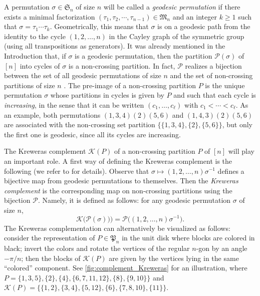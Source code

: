 \documentclass[AHL,XML,longabstracts,Unicode]{cedram}
\def\PPP{\mathcal P}
\begin{document}
A permutation $\sigma \in \mathfrak{S}_{n}$ of size $n$ will be called a {\em geodesic permutation} if
there exists a minimal factorization $(\tau_1,\tau_2,\cdots,\tau_{n-1}) \in \mathfrak{M}_{n}$
and an integer $k \ge 1$ such that $\sigma=\tau_1 \cdots \tau_k$.
Geometrically, this means that $\sigma$ is on a geodesic path from the identity to the cycle
$(1,2,\ldots,n)$ in the Cayley graph of the symmetric group (using all transpositions as generators).
It was already mentioned in the Introduction that, if $\sigma$ is a geodesic permutation,
then the partition $\PPP(\sigma)$ of $[n]$ into cycles of $\sigma$ is a non-crossing partition.
In fact, $\PPP$ realizes a bijection between the set of all  geodesic permutations of size $n$
and the set of non-crossing partitions of size $n$ \cite[Theorem 1]{Biane1997}.
The pre-image of a non-crossing partition $P$ is the unique permutation $\sigma$
whose partitions in cycles is given by $P$ and such that each cycle is {\em increasing},
in the sense that it can be written
$(c_1,\ldots,c_\ell)$ with $c_1<\cdots<c_\ell$.
As an example, both permutations $(1,3,4)(2)(5,6)$ and $(1,4,3)(2)(5,6)$ are associated
with the non-crossing set partition $\{\{1,3,4\},\{2\},\{5,6\}\}$,
but only the first one is geodesic, since all its cycles are increasing.


The Kreweras complement $ \mathcal{K}(P)$ of a non-crossing partition $P$ of $[n]$ will play an important role.
A first way of defining the Kreweras complement is the following (we refer to \cite[Sec.~9 and Sec.~18]{NS06} for details).
Observe that $\sigma \mapsto   (1,2, \ldots,n) \sigma^{-1} $
defines a bijective map from geodesic permutations to themselves.
Then the \emph{Kreweras complement} is the corresponding map on non-crossing partitions
using the bijection $\PPP$.
Namely, it is defined as follows: for any geodesic permutation $\sigma$ of size $n$,
\begin{equation}
\label{eq:K}\mathcal{K}\big(\PPP(\sigma)) \big)= \PPP \big( (1,2, \ldots,n) \sigma^{-1} \big).
\end{equation}
 The Kreweras complementation can alternatively be visualized as follows: consider the representation of $P \in \mathfrak{P}_n$ in the unit disk where blocks are colored in black; invert the colors and rotate the vertices of the regular $n$-gon by an angle $-\pi/n$; then the blocks of $ \mathcal{K}(P)$ are given by the vertices lying in the same ``colored'' component. See \cref{fig:complement_Kreweras} for an illustration,
 where $P=
\{1, 3, 5\}, \{2\}, \{4\}, \{6, 7, 11, 12\}, \{8\}, \{9, 10\}\}$
and $\mathcal{K}(P)=\{\{1, 2\}, \{3, 4\}, \{5, 12\}, \{6\}, \{7, 8, 10\}, \{11\}\}$.
\end{document}
